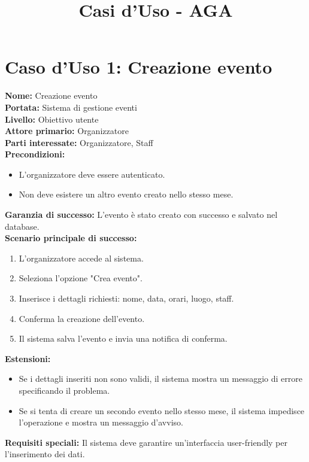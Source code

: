 \documentclass[a4paper,12pt]{article}
\title{\textcolor{titlecolor}{\Huge Casi d'Uso - AGA \\ \text{Formato Dettagliato}}}
\author{}
\date{}
\begin{document}
\maketitle


\section*{\textcolor{sectioncolor}{Caso d'Uso 1: Creazione evento}}
\textcolor{textcolor}{
\textbf{Nome:} Creazione evento\\
\textbf{Portata:} Sistema di gestione eventi\\
\textbf{Livello:} Obiettivo utente\\
\textbf{Attore primario:} Organizzatore\\
\textbf{Parti interessate:} Organizzatore, Staff\\
\textbf{Precondizioni:}
\begin{itemize}
    \item L'organizzatore deve essere autenticato.
    \item Non deve esistere un altro evento creato nello stesso mese.
\end{itemize}
\textbf{Garanzia di successo:} L'evento \`e stato creato con successo e salvato nel database.\\
\textbf{Scenario principale di successo:}
\begin{enumerate}
    \item L'organizzatore accede al sistema.
    \item Seleziona l'opzione "Crea evento".
    \item Inserisce i dettagli richiesti: nome, data, orari, luogo, staff.
    \item Conferma la creazione dell'evento.
    \item Il sistema salva l'evento e invia una notifica di conferma.
\end{enumerate}
\textbf{Estensioni:}
\begin{itemize}
    \item Se i dettagli inseriti non sono validi, il sistema mostra un messaggio di errore specificando il problema.
    \item Se si tenta di creare un secondo evento nello stesso mese, il sistema impedisce l'operazione e mostra un messaggio d'avviso.
\end{itemize}
\textbf{Requisiti speciali:} Il sistema deve garantire un'interfaccia user-friendly per l'inserimento dei dati.
}
\end{document}
